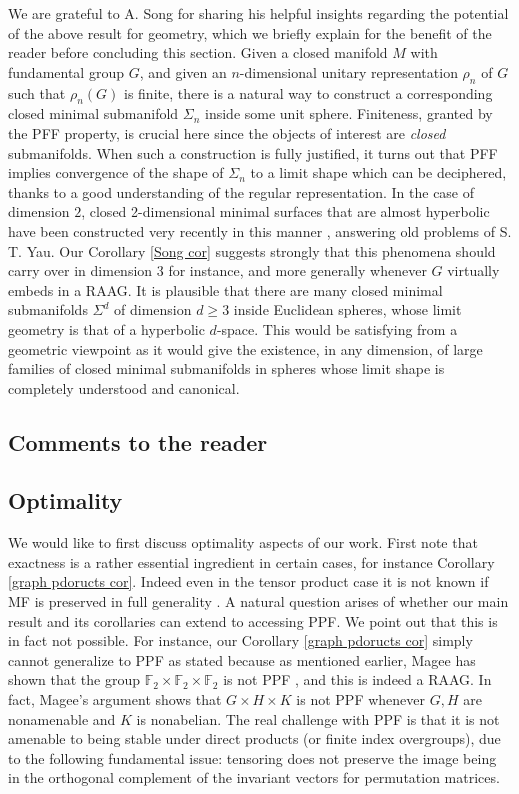 \documentclass[10pt]{amsart}
\theoremstyle{definition}
\begin{document}
We are grateful to A. Song for sharing his helpful insights regarding the potential of the above result for geometry, which we briefly explain for the benefit of the reader before concluding this section. Given a closed manifold $M$ with fundamental group $G$, and given an $n$-dimensional unitary representation $\rho_n$ of $G$ such that $\rho_n(G)$ is finite, there is a natural way to construct a corresponding closed minimal submanifold $\Sigma_n$ inside some unit sphere. Finiteness, granted by the PFF property, is crucial here since the objects of interest are \emph{closed} submanifolds. When such a construction is fully justified, it turns out that PFF implies convergence of the shape of $\Sigma_n$ to a limit shape which can be deciphered, thanks to a good understanding of the regular representation. In the case of dimension $2$, closed 2-dimensional minimal surfaces that are almost hyperbolic have been constructed very recently in this manner \cite{song2025randomharmonicmapsspheres, ancona2025minimalsurfacesnegativecurvature}, answering old problems of S. T. Yau. Our Corollary \ref{Song cor} suggests strongly that this phenomena should carry over in dimension $3$ for instance, and more generally whenever $G$ virtually embeds in a RAAG. It is plausible that there are many closed minimal submanifolds $\Sigma^d$ of dimension $d \geq 3$ inside Euclidean spheres, whose limit geometry is that of a hyperbolic $d$-space. This would be satisfying from a geometric viewpoint as it would give the existence, in any dimension, of large families of closed minimal submanifolds in spheres whose limit shape is completely understood and canonical.

\subsection{Comments to the reader}

\subsection*{Optimality}\label{optimality} We would like to first discuss optimality aspects of our work. First note that exactness is a rather essential ingredient in certain cases, for instance Corollary \ref{graph pdoructs cor}. Indeed even in the tensor product case it is not known if MF is preserved in full generality \cite{HadwinShen2010}. A natural question arises of whether our main result and its corollaries can extend to accessing PPF. We point out that this is in fact not possible. For instance, our Corollary \ref{graph pdoructs cor} simply cannot generalize to PPF as stated because as mentioned earlier, Magee has shown that the group $\mathbb{F}_2\times \mathbb{F}_2\times \mathbb{F}_2$ is not PPF \cite{magee2025strong}, and this is indeed a RAAG. In fact, Magee's argument shows that $G\times H\times K$ is not PPF whenever $G,H$ are nonamenable and $K$ is nonabelian. The real challenge with PPF is that it is not amenable to being stable under direct products (or finite index overgroups), due to the following fundamental issue: tensoring does not preserve the image being in the orthogonal complement of the invariant vectors for permutation matrices. 
\end{document}

